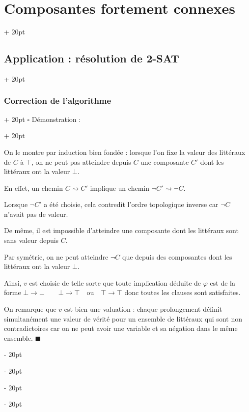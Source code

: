 \documentclass[a4paper, 12pt, twoside]{article}
\newcommand{\ind}[1][20pt]{\advance\leftskip + #1}
\newcommand{\deind}[1][20pt]{\advance\leftskip - #1}
\newenvironment{indt}[2][20pt]{#2 \par \ind[#1]}{\par \deind} %
\newenvironment{proof}[1][{Démonstration :}]{\begin{indt}{$\square$ #1}}{$\blacksquare$ \end{indt}}
\begin{document}
\begin{indt}{\section{Composantes fortement connexes}}
\begin{indt}{\subsection{Application : résolution de 2-SAT}}
\begin{indt}{\subsubsection{Correction de l'algorithme}}
\begin{proof}
                    \vspace{12pt}
                    
                    On le montre par induction bien fondée :
                    lorsque l'on fixe la valeur des littéraux de $C$ à $\top$, on ne peut pas atteindre depuis $C$ une composante $C'$ dont les littéraux ont la valeur $\bot$.

                    En effet, un chemin $C \rightsquigarrow C'$ implique un chemin $\neg C' \rightsquigarrow \neg C$.

                    Lorsque $\neg C'$ a été choisie, cela contredit l'ordre topologique inverse car $\neg C$ n'avait pas de valeur.

                    De même, il est impossible d'atteindre une composante dont les littéraux sont sans valeur depuis $C$.

                    Par symétrie, on ne peut atteindre $\neg C$ que depuis des composantes dont les littéraux ont la valeur $\bot$.

                    Ainsi, $v$ est choisie de telle sorte que toute implication déduite de $\varphi$ est de la forme $\bot \rightarrow \bot \qquad \bot \rightarrow \top \quad\text{ou}\quad \top \rightarrow \top$ donc toutes les clauses sont satisfaites.

                    On remarque que $v$ est bien une valuation : chaque prolongement définit simultanément une valeur de vérité pour un ensemble de littéraux qui sont non contradictoires car on ne peut avoir une variable et sa négation dans le même ensemble.
                \end{proof}
            \end{indt}
        \end{indt}
        
    \end{indt}

    \vspace{12pt}
    
\end{document}
